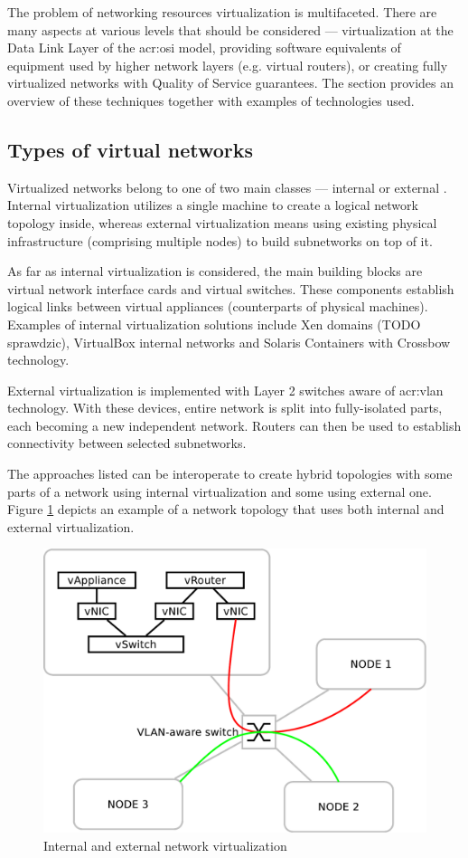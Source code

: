 \documentclass[11pt]{book}
\begin{document}
      The problem of networking resources virtualization is multifaceted. There are many aspects at various levels that
      should be considered --- virtualization at the Data Link Layer of the \gls{acr:osi} model, providing software
      equivalents of equipment used by higher network layers (e.g. virtual routers), or creating fully virtualized
      networks with Quality of Service guarantees. The section provides an overview of these techniques together with
      examples of technologies used.


      \subsection{Types of virtual networks}

        Virtualized networks belong to one of two main classes --- internal or external \cite{nsag}. Internal
        virtualization utilizes a single machine to create a logical network topology inside, whereas external
        virtualization means using existing physical infrastructure (comprising multiple nodes) to build subnetworks on
        top of it.

        As far as internal virtualization is considered, the main building blocks are virtual network interface cards
        and virtual switches. These components establish logical links between virtual appliances (counterparts of
        physical machines). Examples of internal virtualization solutions include Xen domains (TODO sprawdzic),
        VirtualBox internal networks \cite{vboxum} and Solaris Containers with Crossbow technology.

        External virtualization is implemented with Layer 2 switches aware of \gls{acr:vlan} technology. With these
        devices, entire network is split into fully-isolated parts, each becoming a new independent network. Routers can
        then be used to establish connectivity between selected subnetworks.

        The approaches listed can be interoperate to create hybrid topologies with some parts of a network using
        internal virtualization and some using external one. Figure \ref{fig:ctx:nvtypes} depicts an example of a
        network topology that uses both internal and external virtualization.
        

        \begin{figure}[H]
          \centering
          \includegraphics[width=.5\textwidth]{img/ctx/vnet-types.pdf}

          \caption{Internal and external network virtualization}
          \label{fig:ctx:nvtypes}
        \end{figure}
\end{document}
